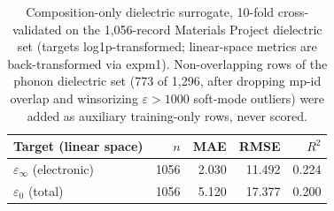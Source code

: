 \begin{table}[t]
\centering
\caption{Composition-only dielectric surrogate, 10-fold cross-validated on the 1,056-record Materials Project dielectric set (targets log1p-transformed; linear-space metrics are back-transformed via expm1). Non-overlapping rows of the phonon dielectric set (773 of 1,296, after dropping mp-id overlap and winsorizing $\varepsilon>1000$ soft-mode outliers) were added as auxiliary training-only rows, never scored.}
\label{tab:a5_dielectric}
\begin{tabular}{lrrrr}
\toprule
Target (linear space) & $n$ & MAE & RMSE & $R^2$ \\
\midrule
$\varepsilon_{\infty}$ (electronic) & 1056 & 2.030 & 11.492 & 0.224 \\
$\varepsilon_{0}$ (total) & 1056 & 5.120 & 17.377 & 0.200 \\
\bottomrule
\end{tabular}
\end{table}
